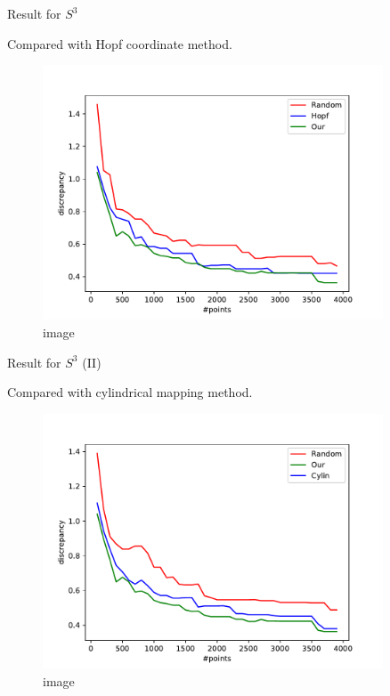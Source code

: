 \documentclass[10pt,ignorenonframetext,serif,onlymath]{beamer}
\begin{document}
\begin{frame}{Result for \(S^3\)}
\protect\hypertarget{result-for-s3}{}

Compared with Hopf coordinate method.

\begin{figure}
\centering
\includegraphics[width=0.9\textwidth,height=\textheight]{res_hopf.pdf}
\caption{image}
\end{figure}

\end{frame}

\begin{frame}{Result for \(S^3\) (II)}
\protect\hypertarget{result-for-s3-ii}{}

Compared with cylindrical mapping method.

\begin{figure}
\centering
\includegraphics[width=0.9\textwidth,height=\textheight]{res-S3-cylin.pdf}
\caption{image}
\end{figure}

\end{frame}
\end{document}
